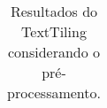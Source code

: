 \begin{table}[!h]
\begin{tabular}{|c|c||c|c|c|c|c||c|c|c|c|c|}
 \end{tabular}  
\caption{Resultados do TextTiling considerando o pré-processamento.}
\end{table} 


























